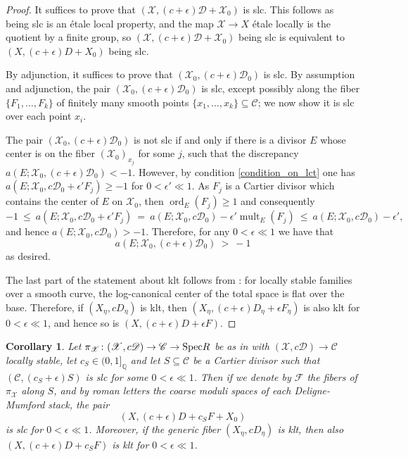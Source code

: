 \documentclass[a4paper,12pt]{amsart}
\newcommand{\mts}[1]{\mathscr{#1}}
\DeclareMathOperator{\mult}{mult}
\DeclareMathOperator{\ord}{ord}
\newcommand{\sF}{\mathscr{F}}
\newcommand{\bQ}{{\mathbb Q}}
\newcommand{\sD}{{\mathscr{D}}}
\newcommand{\sX}{{\mathscr{X}}}
\newcommand{\sC}{{\mathscr{C}}}
\newcommand\spec{\text{\rm Spec}}
\newtheorem{corollary}[theorem]{Corollary}
\theoremstyle{definition}
\theoremstyle{remark}
\begin{document}
\begin{proof}
It suffices to prove that $(\sX,(c+\epsilon)\sD+\sX_0)$ is slc. This follows as being slc is an \'etale local property, and the map $\sX\to X$ \'etale locally is the quotient by a finite group, so $(\sX,(c+\epsilon)\sD+\sX_0)$ being slc is equivalent to $(X,(c+\epsilon){D}+ X_0)$ being slc.


By adjunction, it suffices to prove that $(\sX_0,(c+\epsilon)\sD_0)$ is slc. By assumption and adjunction, the pair $(\sX_0,(c+\epsilon)\sD_0)$ is slc, except possibly along the fiber $\{F_1,\ldots,F_k\}$ of finitely many smooth points $\{x_1,\ldots,x_k\}\subseteq \sC$; we now show it is slc over each point $x_i$. 
    
    The pair $(\sX_0,(c+\epsilon)\sD_0)$ is not slc if and only if there is a divisor $E$ whose center is on the fiber $(\sX_0)_{x_j}$ for some $j$, such that the discrepancy $a(E;\sX_0,(c+\epsilon)\sD_0)<-1$.
    However, by condition \ref{condition_on_lct} one has $ a(E;\sX_0,c\sD_0 + \epsilon' F_j)\geq-1$ for $0<\epsilon'\ll 1$. As $F_j$ is a Cartier divisor which contains the center of $E$ on $\mts{X}_0$, then $\ord_E(F_j)\geq 1$ and consequently \[-1\ \le\  a(E;\sX_0,c\sD_0 +  \epsilon'F_j) \ =\  a(E;\sX_0,c\sD_0) - \epsilon'\mult_E(F_j) \ \leq \ a(E;\sX_0,c\sD_0) - \epsilon', \] and hence $a(E;\sX_0,c\sD_0)> -1$.  Therefore, for any $0<\epsilon \ll 1$ we have that $$a(E;\sX_0,(c+\epsilon)\sD_0 )\ >\ -1$$ as desired.

    The last part of the statement about klt follows from \cite[Theorem 2.80]{Kol23}: for locally stable families over a smooth curve, the log-canonical center of the total space is flat over the base. Therefore, if $(X_\eta,cD_\eta)$ is klt, then $(X_\eta,(c+\epsilon)D_\eta +\epsilon F_\eta)$ is also klt for $0<\epsilon\ll1$, and hence so is $(X,(c+\epsilon)D +\epsilon F)$.
    \end{proof}
\begin{corollary}\label{cor_singularities_remain_slc_if_increasing_coeff_on_d_and_adding_fibers}
    Let $\pi_\sX\colon (\sX,c\sD)\to \sC\to \spec R $ be as in  with $(\sX,c\sD)\to \sC$ locally stable, let $c_S\in (0,1]_{\bQ}$ and let $S\subseteq \sC$ be a Cartier divisor such that $(\sC, (c_S+\epsilon) S)$ is slc for some $0<\epsilon\ll 1$. Then if we denote by $\sF$ the fibers of $\pi_\sX$ along $S$, and by roman letters the coarse moduli spaces of each Deligne-Mumford stack, the pair 
    \[
    (X,(c+\epsilon)D + c_SF + X_0)
    \]
    is slc for $0<\epsilon \ll 1$. Moreover, if the generic fiber $(X_\eta,cD_\eta )$ is klt, then also $(X,(c+\epsilon){D} + c_S F)$ is klt for $0<\epsilon \ll 1$.
\end{corollary}
\end{document}

